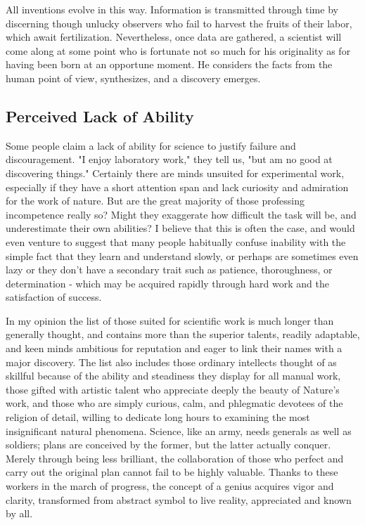 \documentclass{article}
\begin{document}
All inventions evolve in this way. Information is transmitted through time by discerning though unlucky observers who fail to harvest the fruits of their labor, which await fertilization. Nevertheless, once data are gathered, a scientist will come along at some point who is fortunate not so much for his originality as for having been born at an opportune moment. He considers the facts from the human point of view, synthesizes, and a discovery emerges.

\subsection*{Perceived Lack of Ability}

Some people claim a lack of ability for science to justify failure and discouragement. "I enjoy laboratory work," they tell us, "but am no good at discovering things." Certainly there are minds unsuited for experimental work, especially if they have a short attention span and lack curiosity and admiration for the work of nature. But are the great majority of those professing incompetence really so? Might they exaggerate how difficult the task will be, and underestimate their own abilities? I believe that this is often the case, and would even venture to suggest that many people habitually confuse inability with the simple fact that they learn and understand slowly, or perhaps are sometimes even lazy or they don’t have a secondary trait such as patience, thoroughness, or determination - which may be acquired rapidly through hard work and the satisfaction of success.

In my opinion the list of those suited for scientific work is much longer than generally thought, and contains more than the superior talents, readily adaptable, and keen minds ambitious for reputation and eager to link their names with a major discovery. The list also includes those ordinary intellects thought of as skillful because of the ability and steadiness they display for all manual work, those gifted with artistic talent who appreciate deeply the beauty of Nature’s work, and those who are simply curious, calm, and phlegmatic devotees of the religion of detail, willing to dedicate long hours to examining the most insignificant natural phenomena. Science, like an army, needs generals as well as soldiers; plans are conceived by the former, but the latter actually conquer. Merely through being less brilliant, the collaboration of those who perfect and carry out the original plan cannot fail to be highly valuable. Thanks to these workers in the march of progress, the concept of a genius acquires vigor and clarity, transformed from abstract symbol to live reality, appreciated and known by all.
\end{document}

